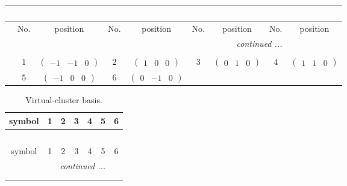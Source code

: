 \documentclass[fleqn,10pt,landscape]{article}
\begin{document}
\begin{itemize}
{\begin{center}
\begin{longtable}{ccccccccc}
\multicolumn{8}{l}{\tablename\ \thetable{}} \\
 \hline \hline
 & No. & position & No. & position & No. & position & No. & position \\ \hline \endhead

 \hline \hline
\multicolumn{8}{r}{\footnotesize\it continued ...} \\ \endfoot

 \hline \hline
\multicolumn{8}{r}{} \\ \endlastfoot

 & $ 1 $ & $ \begin{pmatrix} -1 & -1 & 0 \end{pmatrix} $ & $ 2 $ & $ \begin{pmatrix} 1 & 0 & 0 \end{pmatrix} $ & $ 3 $ & $ \begin{pmatrix} 0 & 1 & 0 \end{pmatrix} $ & $ 4 $ & $ \begin{pmatrix} 1 & 1 & 0 \end{pmatrix} $ \\
& $ 5 $ & $ \begin{pmatrix} -1 & 0 & 0 \end{pmatrix} $ & $ 6 $ & $ \begin{pmatrix} 0 & -1 & 0 \end{pmatrix} $ & $  $ & $  $ & $  $ & $  $ \\
\end{longtable}
\end{center}
\begin{center}
\renewcommand{\arraystretch}{1.7}
\begin{longtable}{ccccccc}
\caption{Virtual-cluster basis.}
 \\
 \hline \hline
symbol & 1 & 2 & 3 & 4 & 5 & 6 \\ \hline \endfirsthead

\multicolumn{6}{l}{\tablename\ \thetable{}} \\
 \hline \hline
symbol & 1 & 2 & 3 & 4 & 5 & 6 \\ \hline \endhead

 \hline \hline
\multicolumn{6}{r}{\footnotesize\it continued ...} \\ \endfoot

 \hline \hline
\multicolumn{6}{r}{} \\ \endlastfoot


\end{longtable}
\end{center}}
\end{itemize}
\end{document}
